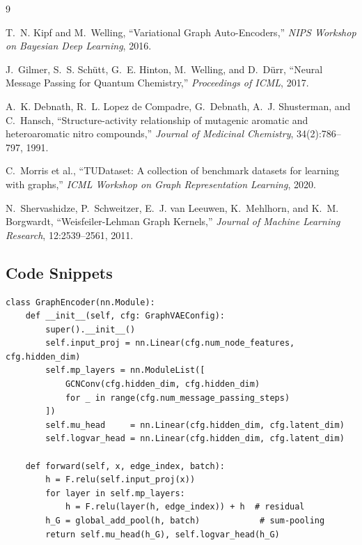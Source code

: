 \documentclass[10pt,a4paper]{article}
\begin{document}
\newpage
\begin{thebibliography}{9}

T.~N. Kipf and M.~Welling,
``Variational Graph Auto-Encoders,''
\textit{NIPS Workshop on Bayesian Deep Learning}, 2016.

J.~Gilmer, S.~S. Schütt, G.~E. Hinton, M.~Welling, and D.~Dürr,
``Neural Message Passing for Quantum Chemistry,''
\textit{Proceedings of ICML}, 2017.

A.~K. Debnath, R.~L. Lopez de Compadre, G.~Debnath, A.~J. Shusterman, and C.~Hansch,
``Structure-activity relationship of mutagenic aromatic and heteroaromatic nitro compounds,''
\textit{Journal of Medicinal Chemistry}, 34(2):786--797, 1991.

C.~Morris et al.,
``TUDataset: A collection of benchmark datasets for learning with graphs,''
\textit{ICML Workshop on Graph Representation Learning}, 2020.

N.~Shervashidze, P.~Schweitzer, E.~J. van Leeuwen, K.~Mehlhorn, and K.~M. Borgwardt,
``Weisfeiler-Lehman Graph Kernels,''
\textit{Journal of Machine Learning Research}, 12:2539--2561, 2011.

\end{thebibliography}

\newpage
\subsection*{Code Snippets}

\begin{lstlisting}[caption={Message-passing encoder with sum-pooling readout (model\_gvae.py).}]
class GraphEncoder(nn.Module):
    def __init__(self, cfg: GraphVAEConfig):
        super().__init__()
        self.input_proj = nn.Linear(cfg.num_node_features, cfg.hidden_dim)
        self.mp_layers = nn.ModuleList([
            GCNConv(cfg.hidden_dim, cfg.hidden_dim)
            for _ in range(cfg.num_message_passing_steps)
        ])
        self.mu_head     = nn.Linear(cfg.hidden_dim, cfg.latent_dim)
        self.logvar_head = nn.Linear(cfg.hidden_dim, cfg.latent_dim)

    def forward(self, x, edge_index, batch):
        h = F.relu(self.input_proj(x))
        for layer in self.mp_layers:
            h = F.relu(layer(h, edge_index)) + h  # residual
        h_G = global_add_pool(h, batch)            # sum-pooling
        return self.mu_head(h_G), self.logvar_head(h_G)
\end{lstlisting}
\end{document}
